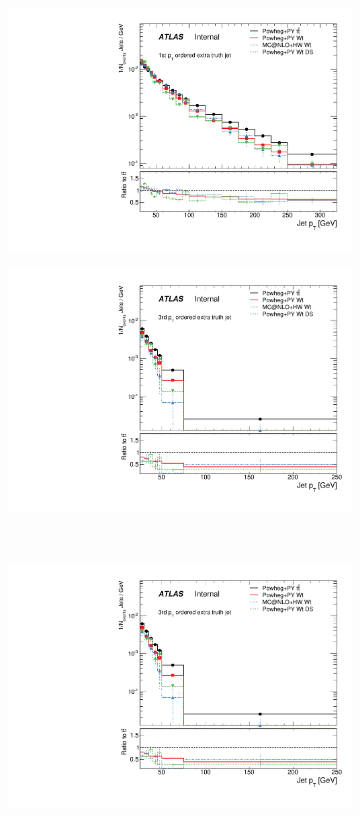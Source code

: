 \begin{figure}
\centering
\begin{subfigure}[]{0.33\textwidth}
\includegraphics[width=\textwidth]{fig/MCComp/WtTruthPtJet0.pdf}
\end{subfigure}
\begin{subfigure}[]{0.33\textwidth}
\includegraphics[width=\textwidth]{fig/MCComp/WtTruthPtJet2.pdf}
\end{subfigure}
\\
\begin{subfigure}[]{0.33\textwidth}
\includegraphics[width=\textwidth]{fig/MCComp/WtTruthPtJet2.pdf}

\end{subfigure}
\end{figure}
